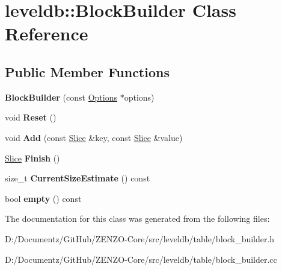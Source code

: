 \hypertarget{classleveldb_1_1_block_builder}{}\section{leveldb\+::Block\+Builder Class Reference}
\label{classleveldb_1_1_block_builder}
\subsection*{Public Member Functions}
\begin{DoxyCompactItemize}
\item 
\mbox{\label{classleveldb_1_1_block_builder_a697ffa03ff6e8f5dec0558c05136f89c}} 
{\bfseries Block\+Builder} (const \mbox{\hyperlink{structleveldb_1_1_options}{Options}} $\ast$options)
\item 
\mbox{\label{classleveldb_1_1_block_builder_a812168608c24de2dfa1651fcdd88e49b}} 
void {\bfseries Reset} ()
\item 
\mbox{\label{classleveldb_1_1_block_builder_a17d0e23f1e7afcb874b22a0cb0b6cf17}} 
void {\bfseries Add} (const \mbox{\hyperlink{classleveldb_1_1_slice}{Slice}} \&key, const \mbox{\hyperlink{classleveldb_1_1_slice}{Slice}} \&value)
\item 
\mbox{\label{classleveldb_1_1_block_builder_ab345ab44def13fb180502e9637b28bcd}} 
\mbox{\hyperlink{classleveldb_1_1_slice}{Slice}} {\bfseries Finish} ()
\item 
\mbox{\label{classleveldb_1_1_block_builder_afad3886f946a9cbe2e147757e49db98b}} 
size\+\_\+t {\bfseries Current\+Size\+Estimate} () const
\item 
\mbox{\label{classleveldb_1_1_block_builder_ab77e58261a06eadc2bc37bec8d390569}} 
bool {\bfseries empty} () const
\end{DoxyCompactItemize}


The documentation for this class was generated from the following files\+:\begin{DoxyCompactItemize}
\item 
D\+:/\+Documentz/\+Git\+Hub/\+Z\+E\+N\+Z\+O-\/\+Core/src/leveldb/table/block\+\_\+builder.\+h\item 
D\+:/\+Documentz/\+Git\+Hub/\+Z\+E\+N\+Z\+O-\/\+Core/src/leveldb/table/block\+\_\+builder.\+cc\end{DoxyCompactItemize}
